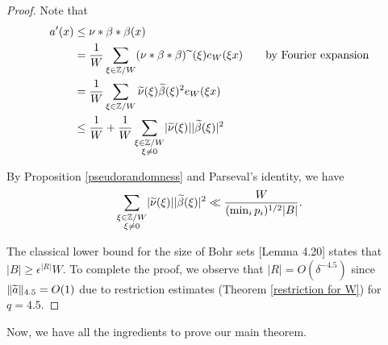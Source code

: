 \documentclass[11pt]{amsart}
\theoremstyle{plain} %
\theoremstyle{remark}
\numberwithin{equation}{section}
\newcommand{\Z}{\mathbb{Z}}
\DeclarePairedDelimiter\abs{\lvert}{\rvert}
\DeclarePairedDelimiter\norm{\lVert}{\rVert}
\begin{document}
\begin{proof}
    Note that
    \begin{equation*}
        \begin{split}
            a'(x)&\leq \nu*\beta*\beta(x)\\
            &=\frac{1}{W}\sum_{\xi\in\Z/W}(\nu*\beta*\beta)\widetilde{\;\;}(\xi)e_W(\xi x)\quad\quad\text{by Fourier expansion}\\
            &=\frac{1}{W}\sum_{\xi\in\Z/W}\widetilde{\nu}(\xi)\widetilde{\beta}(\xi)^2e_W(\xi x)\\
            &\leq\frac{1}{W}+\frac{1}{W}\sum_{\substack{\xi\in\Z/W\\\xi\neq 0}}\abs{\widetilde{\nu}(\xi)}\abs{\widetilde{\beta}(\xi)}^2
        \end{split}
    \end{equation*}

    By Proposition \ref{pseudorandomness} and Parseval's identity, we have
    \begin{equation*}
        \sum_{\substack{\xi\in\Z/W\\\xi\neq 0}}\abs{\widetilde{\nu}(\xi)}\abs{\widetilde{\beta}(\xi)}^2\ll \frac{W}{(\min_i p_i)^{1/2}|B|}.
    \end{equation*}

    The classical lower bound for the size of Bohr sets \cite{TaoVu}[Lemma 4.20] states that $|B|\geq \epsilon^{|R|} W$. To complete the proof, we observe that $|R|=O(\delta^{-4.5})$ since $\norm{\widetilde{a}}_{4.5}=O(1)$ due to restriction estimates (Theorem \ref{restriction for W}) for $q=4.5$.
\end{proof}

Now, we have all the ingredients to prove our main theorem.
\end{document}
